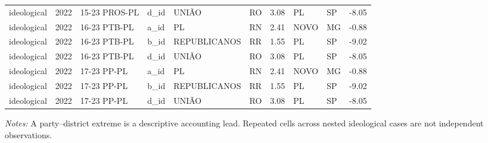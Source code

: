 \begin{landscape}
\begin{longtable}{lll l L{2.7cm}l r L{2.7cm}l r}
ideological & 2022 & 15-23 PROS-PL & d\_id & UNIÃO & RO & 3.08 & PL & SP & -8.05 \\
ideological & 2022 & 16-23 PTB-PL & a\_id & PL & RN & 2.41 & NOVO & MG & -0.88 \\
ideological & 2022 & 16-23 PTB-PL & b\_id & REPUBLICANOS & RR & 1.55 & PL & SP & -9.02 \\
ideological & 2022 & 16-23 PTB-PL & d\_id & UNIÃO & RO & 3.08 & PL & SP & -8.05 \\
ideological & 2022 & 17-23 PP-PL & a\_id & PL & RN & 2.41 & NOVO & MG & -0.88 \\
ideological & 2022 & 17-23 PP-PL & b\_id & REPUBLICANOS & RR & 1.55 & PL & SP & -9.02 \\
ideological & 2022 & 17-23 PP-PL & d\_id & UNIÃO & RO & 3.08 & PL & SP & -8.05 \\
\end{longtable}
\noindent\footnotesize\textit{Notes:} A party--district extreme is a descriptive accounting lead. Repeated cells across nested ideological cases are not independent observations.
\endgroup
\end{landscape}
